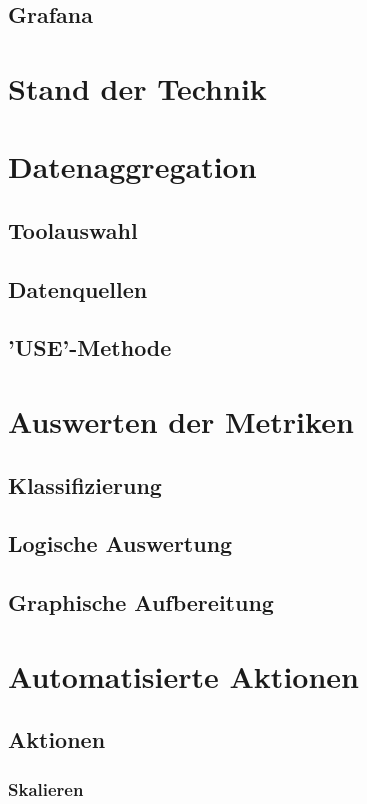 \documentclass[a4paper,12pt]{scrartcl}
\begin{document}
\subsection{Grafana}

\section{Stand der Technik}

\section{Datenaggregation}
\subsection{Toolauswahl}
\subsection{Datenquellen}
\subsection{'USE'-Methode}

\section{Auswerten der Metriken}
\subsection{Klassifizierung}
\subsection{Logische Auswertung}
\subsection{Graphische Aufbereitung}

\section{Automatisierte Aktionen}
\subsection{Aktionen}
\subsubsection{Skalieren}
\end{document}
